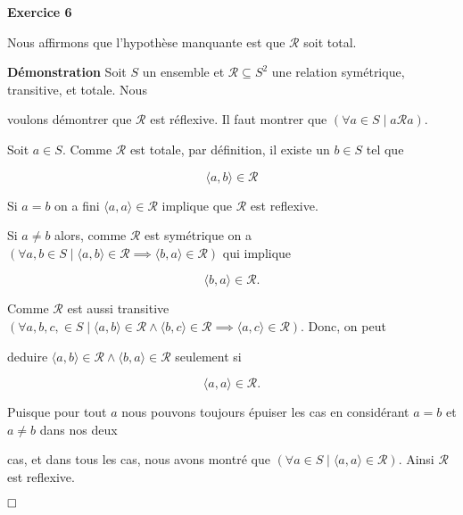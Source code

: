 \documentclass{article}
\begin{document}
\textbf{Exercice 6}

\vspace{0.5cm}

Nous affirmons que l’hypothèse manquante est que $\mathcal{R}$ soit total.

\vspace{0.5cm}

\textbf{Démonstration} Soit \(S\) un ensemble et \(\mathcal{R} \subseteq S^2\) une relation symétrique, transitive, et totale. Nous 

voulons démontrer que \( \mathcal{R} \) est réflexive. Il faut montrer que $ ( \forall a \in S \mid a \mathcal{R} a)$.

Soit \(a \in S\). Comme \( \mathcal{R} \) est totale, par définition, il existe un \(b \in S\) tel que 

$$ \langle a, b \rangle \in \mathcal{R} $$

Si $a = b$ on a fini $ \langle a,a \rangle \in \mathcal{R}$ implique que $ \mathcal{R}$ est reflexive.

Si $a \neq b$ alors, comme $ \mathcal{R} $ est symétrique on a $(\forall a,b \in S \mid \langle a,b \rangle \in \mathcal{R} \implies \langle b,a \rangle \in \mathcal{R} )$ qui implique

$$\langle b,a \rangle \in \mathcal{R}.$$

Comme $\mathcal{R}$ est aussi transitive $ ( \forall a, b, c, \in S \mid \langle a,b \rangle \in \mathcal{R} \land \langle b,c \rangle \in \mathcal{R} \implies \langle a,c \rangle \in \mathcal{R} )$. Donc, on peut 

deduire $\langle a,b \rangle \in \mathcal{R} \land \langle b,a \rangle \in \mathcal{R}$ seulement si

$$\langle a,a \rangle \in \mathcal{R}.$$

Puisque pour tout $ a $ nous pouvons toujours épuiser les cas en considérant $a = b$ et $a \neq b$ dans nos deux 

cas, et dans tous les cas, nous avons montré que $( \forall a \in S \mid \langle a,a \rangle \in \mathcal{R} ) $. Ainsi $ \mathcal{R}$ est reflexive.

$\hfill \square$
\end{document}
